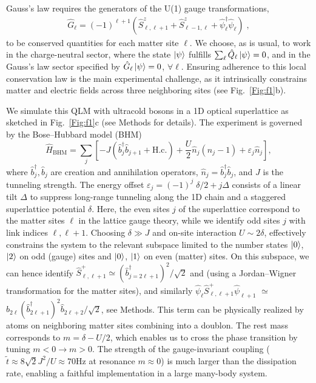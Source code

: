 \documentclass[aps,prl,twocolumn,superscriptaddress,footinbib,linenumbers]{revtex4}
\newcommand{\Fig}[1]{Fig.~\ref{#1}}
\begin{document}
Gauss's law requires the generators of the U(1) gauge transformations,
\begin{align}
\hat{G}_\ell = (-1)^{\ell+1}\left(\hat{S}^z_{\ell,\ell+1} + \hat{S}^z_{\ell-1,\ell} + \hat{\psi}^{\dagger}_{\ell}\hat{\psi}_{\ell}\right) \; ,
\label{eq:Gauss-law}
\end{align}
to be conserved quantities for each matter site $\ell$. We choose, as is usual, to work in the charge-neutral sector, where the state $\ket{\psi}$ fulfills $\sum_{\ell} \hat{Q}_{\ell}\ket{\psi} = 0$, and in the Gauss's law sector specified by $\hat{G}_{\ell}\ket{\psi}=0$, $\forall \ell$. Ensuring adherence to this local conservation law is the main experimental challenge, as it intrinsically constrains matter and electric fields across three neighboring sites (see \Fig{Fig:f1}b).

We simulate this QLM with ultracold bosons in a 1D optical superlattice as sketched in \Fig{Fig:f1}c (see Methods for details). The experiment is governed by the Bose--Hubbard model (BHM)
\begin{equation}
\label{eq:BH_Hamiltonian}
\hat{H}_{\mathrm{BHM}}  = \sum_{j}\left[- J  (\hat{b}_j^{\dagger} \hat{b}_{j+1} + \mathrm{H.c.}) +  \frac{U}{2}\hat{n}_j (\hat{n}_j-1)  +   \varepsilon_j \hat{n}_j\right] ,
\end{equation}
where $\hat{b}_j^\dagger, \hat{b}_j$ are creation and annihilation operators, $\hat{n}_j=\hat{b}_j^\dagger \hat{b}_j$, and $J$ is the tunneling strength.
The energy offset $\varepsilon_j = (-1)^j\; \delta/2 + j\Delta$ consists of a linear tilt $\Delta$ to suppress long-range tunneling along the 1D chain and a staggered superlattice potential $\delta$. Here, the even sites $j$ of the superlattice correspond to the matter sites $\ell$ in the lattice gauge theory, while we identify odd sites $j$ with link indices $\ell,\ell+1$. Choosing $\delta\gg J$ and on-site interaction $U\sim 2\delta$, effectively constrains the system to the relevant subspace limited to the number states $\ket{0}$, $\ket{2}$ on odd (gauge) sites and $\ket{0}$, $\ket{1}$ on even (matter) sites.
On this subspace, we can hence identify $\hat{S}^+_{\ell,\ell+1}$$\simeq$$(\hat{b}_{j=2\ell+1}^{\dagger})^2/\sqrt{2}$ and (using a Jordan--Wigner transformation for the matter sites), and similarly $\hat{\psi}_{\ell} \hat{S}^{+}_{\ell,\ell+1} \hat{\psi}_{\ell+1}$ $\simeq$ $\hat{b}_{2\ell} (\hat{b}_{2\ell+1}^{\dagger})^2 \hat{b}_{2\ell+2}/\sqrt{2}$, see Methods.
This term can be physically realized by atoms on neighboring matter sites combining into a doublon.
The rest mass corresponds to $m = \delta - U/2$, which enables us to cross the phase transition by tuning $m <0 \rightarrow m>0$.
The strength of the gauge-invariant coupling ($\tilde{t} \approx 8\sqrt{2} J^2/U\approx 70$Hz at resonance $m \approx 0$) is much larger than the dissipation rate, enabling a faithful implementation in a large many-body system.
\end{document}
